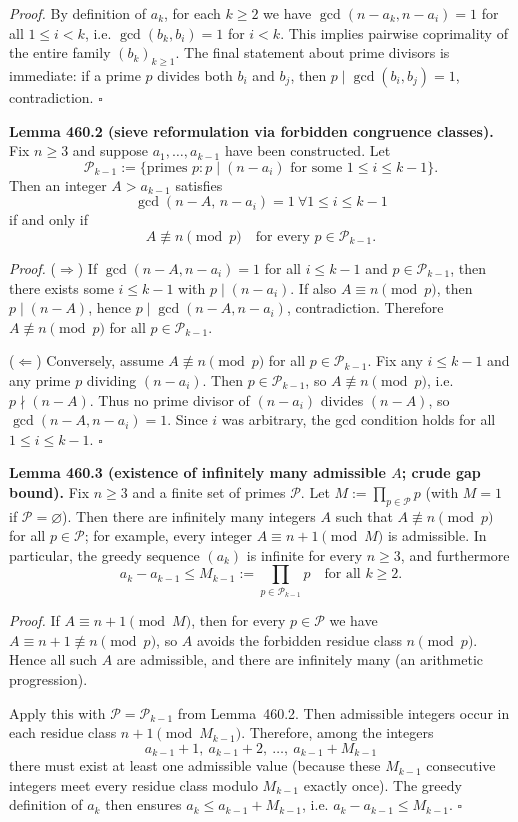 \textit{Proof.}
By definition of $a_k$, for each $k\ge 2$ we have $\gcd(n-a_k,n-a_i)=1$ for all $1\le i<k$, i.e. $\gcd(b_k,b_i)=1$ for $i<k$. This implies pairwise coprimality of the entire family $(b_k)_{k\ge 1}$. The final statement about prime divisors is immediate: if a prime $p$ divides both $b_i$ and $b_j$, then $p\mid \gcd(b_i,b_j)=1$, contradiction. \hfill$\square$

\medskip
\noindent\textbf{Lemma 460.2 (sieve reformulation via forbidden congruence classes).}
Fix $n\ge 3$ and suppose $a_1,\dots,a_{k-1}$ have been constructed. Let
\[\mathcal P_{k-1}:=\{\text{primes }p: p\mid (n-a_i)\text{ for some }1\le i\le k-1\}.
\]
Then an integer $A>a_{k-1}$ satisfies
\[\gcd(n-A,\,n-a_i)=1\ \forall 1\le i\le k-1\]
if and only if
\[A\not\equiv n\pmod p\quad\text{for every }p\in\mathcal P_{k-1}.
\]

\textit{Proof.}
($\Rightarrow$) If $\gcd(n-A,n-a_i)=1$ for all $i\le k-1$ and $p\in\mathcal P_{k-1}$, then there exists some $i\le k-1$ with $p\mid (n-a_i)$. If also $A\equiv n\pmod p$, then $p\mid (n-A)$, hence $p\mid\gcd(n-A,n-a_i)$, contradiction. Therefore $A\not\equiv n\pmod p$ for all $p\in\mathcal P_{k-1}$.

($\Leftarrow$) Conversely, assume $A\not\equiv n\pmod p$ for all $p\in\mathcal P_{k-1}$. Fix any $i\le k-1$ and any prime $p$ dividing $(n-a_i)$. Then $p\in\mathcal P_{k-1}$, so $A\not\equiv n\pmod p$, i.e. $p\nmid(n-A)$. Thus no prime divisor of $(n-a_i)$ divides $(n-A)$, so $\gcd(n-A,n-a_i)=1$. Since $i$ was arbitrary, the gcd condition holds for all $1\le i\le k-1$. \hfill$\square$

\medskip
\noindent\textbf{Lemma 460.3 (existence of infinitely many admissible $A$; crude gap bound).}
Fix $n\ge 3$ and a finite set of primes $\mathcal P$. Let $M:=\prod_{p\in\mathcal P} p$ (with $M=1$ if $\mathcal P=\varnothing$). Then there are infinitely many integers $A$ such that $A\not\equiv n\pmod p$ for all $p\in\mathcal P$; for example, every integer $A\equiv n+1\pmod M$ is admissible. In particular, the greedy sequence $(a_k)$ is infinite for every $n\ge 3$, and furthermore
\[a_k-a_{k-1}\le M_{k-1}:=\prod_{p\in\mathcal P_{k-1}} p\quad\text{for all }k\ge 2.
\]

\textit{Proof.}
If $A\equiv n+1\pmod M$, then for every $p\in\mathcal P$ we have $A\equiv n+1\not\equiv n\pmod p$, so $A$ avoids the forbidden residue class $n\pmod p$. Hence all such $A$ are admissible, and there are infinitely many (an arithmetic progression).

Apply this with $\mathcal P=\mathcal P_{k-1}$ from Lemma~460.2. Then admissible integers occur in each residue class $n+1\pmod {M_{k-1}}$. Therefore, among the integers
\[a_{k-1}+1,\ a_{k-1}+2,\ \dots,\ a_{k-1}+M_{k-1}\]
there must exist at least one admissible value (because these $M_{k-1}$ consecutive integers meet every residue class modulo $M_{k-1}$ exactly once). The greedy definition of $a_k$ then ensures $a_k\le a_{k-1}+M_{k-1}$, i.e. $a_k-a_{k-1}\le M_{k-1}$. \hfill$\square$

